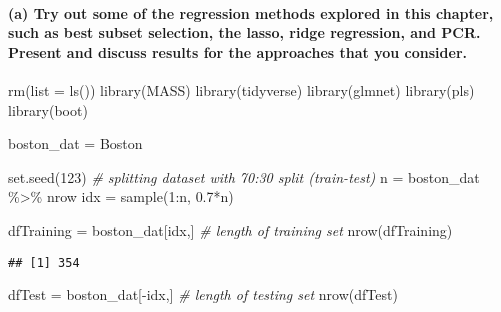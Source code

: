 \documentclass[
]{article}
\newenvironment{Shaded}{\begin{snugshade}}{\end{snugshade}}
\newcommand{\AttributeTok}[1]{\textcolor[rgb]{0.77,0.63,0.00}{#1}}
\newcommand{\CommentTok}[1]{\textcolor[rgb]{0.56,0.35,0.01}{\textit{#1}}}
\newcommand{\DecValTok}[1]{\textcolor[rgb]{0.00,0.00,0.81}{#1}}
\newcommand{\FloatTok}[1]{\textcolor[rgb]{0.00,0.00,0.81}{#1}}
\newcommand{\FunctionTok}[1]{\textcolor[rgb]{0.00,0.00,0.00}{#1}}
\newcommand{\NormalTok}[1]{#1}
\newcommand{\OtherTok}[1]{\textcolor[rgb]{0.56,0.35,0.01}{#1}}
\newcommand{\SpecialCharTok}[1]{\textcolor[rgb]{0.00,0.00,0.00}{#1}}
\begin{document}
\hypertarget{a-try-out-some-of-the-regression-methods-explored-in-this-chapter-such-as-best-subset-selection-the-lasso-ridge-regression-and-pcr.-present-and-discuss-results-for-the-approaches-that-you-consider.}{%
\paragraph{(a) Try out some of the regression methods explored in this
chapter, such as best subset selection, the lasso, ridge regression, and
PCR. Present and discuss results for the approaches that you
consider.}\label{a-try-out-some-of-the-regression-methods-explored-in-this-chapter-such-as-best-subset-selection-the-lasso-ridge-regression-and-pcr.-present-and-discuss-results-for-the-approaches-that-you-consider.}}

\begin{Shaded}
\begin{Highlighting}[]
\FunctionTok{rm}\NormalTok{(}\AttributeTok{list =} \FunctionTok{ls}\NormalTok{())}
\FunctionTok{library}\NormalTok{(MASS)}
\FunctionTok{library}\NormalTok{(tidyverse)}
\FunctionTok{library}\NormalTok{(glmnet)}
\FunctionTok{library}\NormalTok{(pls)}
\FunctionTok{library}\NormalTok{(boot)}

\NormalTok{boston\_dat }\OtherTok{=}\NormalTok{ Boston}

\FunctionTok{set.seed}\NormalTok{(}\DecValTok{123}\NormalTok{)}
\CommentTok{\# splitting dataset with 70:30 split (train{-}test)}
\NormalTok{n }\OtherTok{=}\NormalTok{ boston\_dat }\SpecialCharTok{\%\textgreater{}\%}\NormalTok{ nrow}
\NormalTok{idx }\OtherTok{=} \FunctionTok{sample}\NormalTok{(}\DecValTok{1}\SpecialCharTok{:}\NormalTok{n, }\FloatTok{0.7}\SpecialCharTok{*}\NormalTok{n)}


\NormalTok{dfTraining }\OtherTok{=}\NormalTok{ boston\_dat[idx,]}
\CommentTok{\# length of training set}
\FunctionTok{nrow}\NormalTok{(dfTraining)}
\end{Highlighting}
\end{Shaded}

\begin{verbatim}
## [1] 354
\end{verbatim}

\begin{Shaded}
\begin{Highlighting}[]
\NormalTok{dfTest }\OtherTok{=}\NormalTok{ boston\_dat[}\SpecialCharTok{{-}}\NormalTok{idx,]}
\CommentTok{\# length of testing set}
\FunctionTok{nrow}\NormalTok{(dfTest)}
\end{Highlighting}
\end{Shaded}
\end{document}
